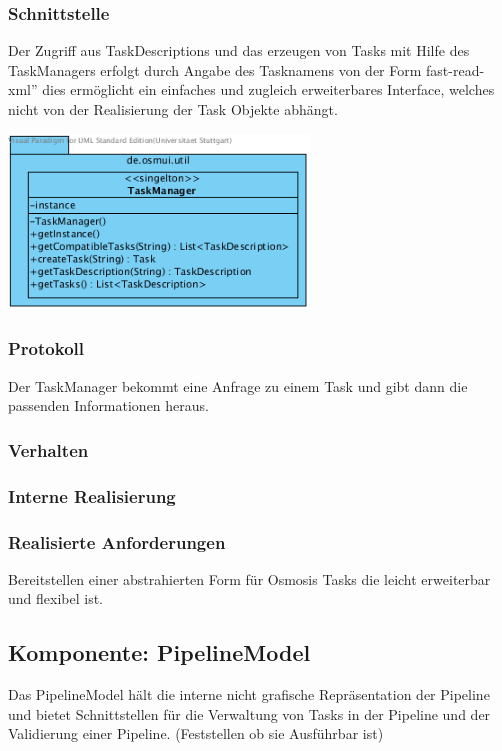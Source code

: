 \documentclass[a4paper,12pt]{scrartcl}
\begin{document}
\subsubsection{Schnittstelle}
Der Zugriff aus TaskDescriptions und das erzeugen von Tasks mit Hilfe des TaskManagers erfolgt durch Angabe des Tasknamens
von der Form \glqq fast-read-xml'' dies ermöglicht ein einfaches und zugleich erweiterbares Interface, welches nicht von der Realisierung der Task Objekte abhängt.
\begin{center}
\includegraphics[width=8cm]{Schnittstelle_TaskManager.png}
\end{center}
\subsubsection{Protokoll}
Der TaskManager bekommt eine Anfrage zu einem Task und gibt dann die passenden Informationen heraus.
\subsubsection{Verhalten}
\subsubsection{Interne Realisierung}
\subsubsection{Realisierte Anforderungen}
Bereitstellen einer abstrahierten Form für Osmosis Tasks die leicht erweiterbar und flexibel ist.

\newpage
\subsection{Komponente: PipelineModel}
Das PipelineModel hält die interne nicht grafische Repräsentation der Pipeline und bietet Schnittstellen für die Verwaltung von Tasks in der Pipeline und der Validierung einer Pipeline. (Feststellen ob sie Ausführbar ist)
\end{document}
